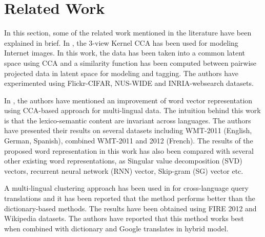 \documentclass{article} %
\begin{document}
	
	
	
	\section{Related Work}
	\label{related_work}
	In this section, some of the related work mentioned in the literature have been explained in brief. In \cite{Gong2013}, the 3-view Kernel CCA has been used for modeling Internet images. In this work, the data has been taken into a common latent space using CCA and a similarity function has been computed between pairwise projected data in latent space for modeling and tagging. The authors have experimented using Flickr-CIFAR, NUS-WIDE and INRIA-websearch datasets.
	
	In \cite{Faruqui2014}, the authors have mentioned an improvement of word vector representation using CCA-based approach for multi-lingual data. The intuition behind this work is that the lexico-semantic content are invariant across languages. The authors have presented their results on several datasets including WMT-2011 (English, German, Spanish), combined WMT-2011 and 2012 (French). The results of the proposed word representation in this work has also been compared with several other existing word representations, as Singular value decomposition (SVD) vectors, recurrent neural network (RNN) vector, Skip-gram (SG) vector etc.
	
	A multi-lingual clustering approach has been used in \cite{Bhattacharya2016} for cross-language query translations and it has been reported that the method performs better than the dictionary-based methods. The results have been obtained using FIRE 2012 and Wikipedia datasets. The authors have reported that this method works best when combined with dictionary and Google translates in hybrid model.
	
\end{document}
